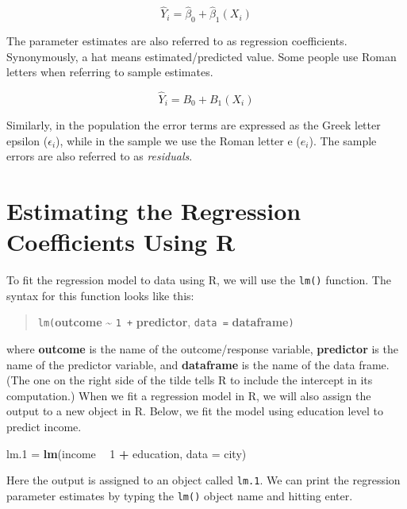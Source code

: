 \documentclass[]{book}
\newenvironment{Shaded}{\begin{snugshade}}{\end{snugshade}}
\newcommand{\DataTypeTok}[1]{\textcolor[rgb]{0.13,0.29,0.53}{#1}}
\newcommand{\DecValTok}[1]{\textcolor[rgb]{0.00,0.00,0.81}{#1}}
\newcommand{\FloatTok}[1]{\textcolor[rgb]{0.00,0.00,0.81}{#1}}
\newcommand{\KeywordTok}[1]{\textcolor[rgb]{0.13,0.29,0.53}{\textbf{#1}}}
\newcommand{\NormalTok}[1]{#1}
\newcommand{\OperatorTok}[1]{\textcolor[rgb]{0.81,0.36,0.00}{\textbf{#1}}}
\newcommand{\StringTok}[1]{\textcolor[rgb]{0.31,0.60,0.02}{#1}}
\theoremstyle{definition}
\theoremstyle{definition}
\theoremstyle{definition}
\theoremstyle{remark}
\begin{document}
\[
\hat{Y}_i = \hat{\beta}_0 + \hat{\beta}_1(X_i)
\]

The parameter estimates are also referred to as regression coefficients.
Synonymously, a hat means estimated/predicted value. Some people use
Roman letters when referring to sample estimates.

\[
\hat{Y}_i = B_0 + B_1(X_i)
\]

Similarly, in the population the error terms are expressed as the Greek
letter epsilon (\(\epsilon_i\)), while in the sample we use the Roman
letter e (\(e_i\)). The sample errors are also referred to as
\emph{residuals}.

\hypertarget{estimating-the-regression-coefficients-using-r}{%
\section{Estimating the Regression Coefficients Using
R}\label{estimating-the-regression-coefficients-using-r}}

To fit the regression model to data using R, we will use the
\texttt{lm()} function. The syntax for this function looks like this:

\begin{quote}
\texttt{lm(}\textbf{outcome} \textasciitilde{} \texttt{1\ +}
\textbf{predictor}, \texttt{data\ =} \textbf{dataframe}\texttt{)}
\end{quote}

where \textbf{outcome} is the name of the outcome/response variable,
\textbf{predictor} is the name of the predictor variable, and
\textbf{dataframe} is the name of the data frame. (The one on the right
side of the tilde tells R to include the intercept in its computation.)
When we fit a regression model in R, we will also assign the output to a
new object in R. Below, we fit the model using education level to
predict income.

\begin{Shaded}
\begin{Highlighting}[]
\NormalTok{lm}\FloatTok{.1}\NormalTok{ =}\StringTok{ }\KeywordTok{lm}\NormalTok{(income }\OperatorTok{~}\StringTok{ }\DecValTok{1} \OperatorTok{+}\StringTok{ }\NormalTok{education, }\DataTypeTok{data =}\NormalTok{ city)}
\end{Highlighting}
\end{Shaded}

Here the output is assigned to an object called \texttt{lm.1}. We can
print the regression parameter estimates by typing the \texttt{lm()}
object name and hitting enter.
\end{document}

